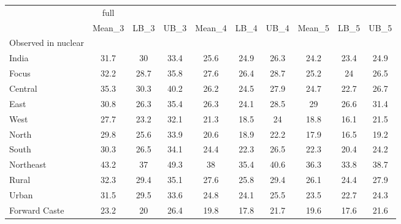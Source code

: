\begin{tabular}{l*{9}{c}}
\toprule
                    &        full&            &            &            &            &            &            &            &            \\
                    &      Mean\_3&        LB\_3&        UB\_3&      Mean\_4&        LB\_4&        UB\_4&      Mean\_5&        LB\_5&        UB\_5\\
\midrule
Observed in nuclear &            &            &            &            &            &            &            &            &            \\
India               &        31.7&          30&        33.4&        25.6&        24.9&        26.3&        24.2&        23.4&        24.9\\
Focus               &        32.2&        28.7&        35.8&        27.6&        26.4&        28.7&        25.2&          24&        26.5\\
Central             &        35.3&        30.3&        40.2&        26.2&        24.5&        27.9&        24.7&        22.7&        26.7\\
East                &        30.8&        26.3&        35.4&        26.3&        24.1&        28.5&          29&        26.6&        31.4\\
West                &        27.7&        23.2&        32.1&        21.3&        18.5&          24&        18.8&        16.1&        21.5\\
North               &        29.8&        25.6&        33.9&        20.6&        18.9&        22.2&        17.9&        16.5&        19.2\\
South               &        30.3&        26.5&        34.1&        24.4&        22.3&        26.5&        22.3&        20.4&        24.2\\
Northeast           &        43.2&          37&        49.3&          38&        35.4&        40.6&        36.3&        33.8&        38.7\\
Rural               &        32.3&        29.4&        35.1&        27.6&        25.8&        29.4&        26.1&        24.4&        27.9\\
Urban               &        31.5&        29.5&        33.6&        24.8&        24.1&        25.5&        23.5&        22.7&        24.3\\
Forward Caste       &        23.2&          20&        26.4&        19.8&        17.8&        21.7&        19.6&        17.6&        21.6\\

\end{tabular}
